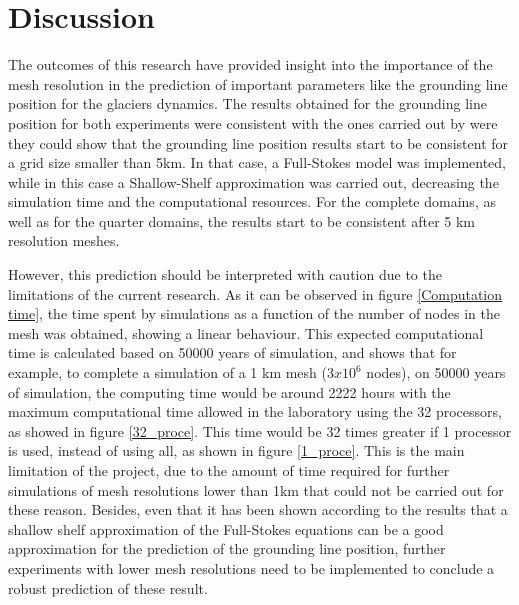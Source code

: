 \documentclass{article}
\begin{document}
\section{Discussion}

The outcomes of this research have provided insight into the importance of the mesh resolution in the prediction of important parameters like the grounding line position for the glaciers dynamics. The results obtained for the grounding line position for both experiments were consistent with the ones carried out by \cite{durand2009full} were they could show that the grounding line position results start to be consistent for a grid size smaller than 5km. In that case, a Full-Stokes model was implemented, while in this case a Shallow-Shelf approximation was carried out, decreasing the simulation time and the computational resources. For the complete domains, as well as for the quarter domains, the results start to be consistent after 5 km resolution meshes. 

However, this prediction should be interpreted with caution due to the limitations of the current research. As it can be observed in figure \ref{Computation time}, the time spent by simulations as a function of the number of nodes in the mesh was obtained, showing a linear behaviour. This expected computational time is calculated based on 50000 years of simulation, and shows that for example, to complete a simulation of a 1 km mesh ($3x10^6$ nodes), on 50000 years of simulation, the computing time would be around 2222 hours with the maximum computational time allowed in the laboratory using the 32 processors, as showed in figure \ref{32_proce}. This time would be 32 times greater if 1 processor is used, instead of using all, as shown in figure \ref{1_proce}. This is the main limitation of the project, due to the amount of time required for further simulations of mesh resolutions lower than 1km that could not be carried out for these reason. Besides, even that it has been shown according to the results that a shallow shelf approximation of the Full-Stokes equations can be a good approximation for the prediction of the grounding line position, further experiments with lower mesh resolutions need to be implemented to conclude a robust prediction of these result. 
\end{document}

